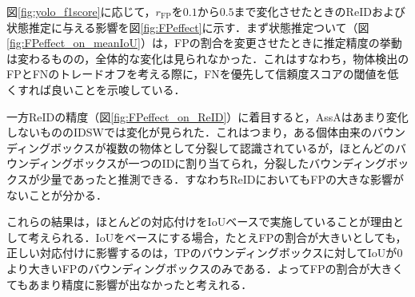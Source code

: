         図\ref{fig:yolo_f1score}に応じて，$r_{\text{FP}}$を$0.1$から$0.5$まで変化させたときのReIDおよび状態推定に与える影響を図\ref{fig:FPeffect}に示す．まず状態推定ついて（図\ref{fig:FPeffect_on_meanIoU}）は，FPの割合を変更させたときに推定精度の挙動は変わるものの，全体的な変化は見られなかった．これはすなわち，物体検出のFPとFNのトレードオフを考える際に，FNを優先して信頼度スコアの閾値を低くすれば良いことを示唆している．

        一方ReIDの精度（図\ref{fig:FPeffect_on_ReID}）に着目すると，AssAはあまり変化しないもののIDSWでは変化が見られた．これはつまり，ある個体由来のバウンディングボックスが複数の物体として分裂して認識されているが，ほとんどのバウンディングボックスが一つのIDに割り当てられ，分裂したバウンディングボックスが少量であったと推測できる．すなわちReIDにおいてもFPの大きな影響がないことが分かる．

        これらの結果は，ほとんどの対応付けをIoUベースで実施していることが理由として考えられる．IoUをベースにする場合，たとえFPの割合が大きいとしても，正しい対応付けに影響するのは，TPのバウンディングボックスに対してIoUが$0$より大きいFPのバウンディングボックスのみである．よってFPの割合が大きくてもあまり精度に影響が出なかったと考えれる．
